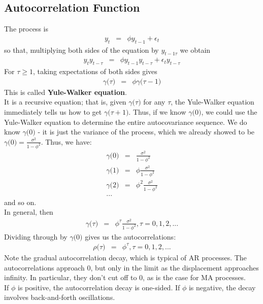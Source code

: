 \subsection{Autocorrelation Function}
The process is
\begin{eqnarray}
y_{t} &=& \phi y_{t - 1} + \epsilon_{t}
\end{eqnarray}
so that, multiplying both sides of the equation by $y_{t - 1\tau}$ we obtain
\begin{eqnarray}
	y_{t}y_{t - \tau} &=& \phi y_{t - 1}y_{t - \tau} + \epsilon_{t} y_{t - \tau}
\end{eqnarray}
For $\tau \geq 1$, taking expectations of both sides gives
\begin{eqnarray}
	\gamma\big(\tau\big) &=& \phi\gamma\big(\tau - 1\big)
\end{eqnarray}
This is called \textbf{\color{blue}Yule-Walker equation}.\\
It is a recursive equation; that is, given $\gamma\big(\tau\big)$ for any $\tau$, the Yule-Walker equation immediately tells us how to get $\gamma\big(\tau + 1\big)$. Thus, if we know $\gamma\big(0\big)$, we could use the Yule-Walker equation to determine the entire autocovariance sequence. We do know $\gamma\big(0\big)$ - it is just the variance of the process, which we already showed to be $\gamma\big(0\big) = \frac{\sigma^{2}}{1 - \phi^{2}}$. Thus, we have:
\begin{eqnarray}
\nonumber
\gamma\big(0\big) &=& \frac{\sigma^{2}}{1 - \phi^{2}}\\
\nonumber
\gamma\big(1\big) &=& \phi\frac{\sigma^{2}}{1 - \phi^{2}}\\
\nonumber
\gamma\big(2\big) &=& \phi^{2}\frac{\sigma^{2}}{1 - \phi^{2}}\\
\nonumber
...
\end{eqnarray}
and so on.\\
In general, then
\begin{eqnarray}
\gamma\big(\tau\big) &=& \phi^{\tau}\frac{\sigma^{2}}{1 - \phi^{2}}, \tau = 0, 1, 2, ...
\end{eqnarray}
Dividing through by $\gamma\big(0\big)$ gives us the autocorrelations:
\begin{eqnarray}
	\rho\big(\tau\big) &=& \phi^{\tau}, \tau = 0, 1, 2, ...
\end{eqnarray}
Note the gradual autocorrelation decay, which is typical of AR processes. The autocorrelations approach 0, but only in the limit as the displacement approaches infinity. In particular, they don't cut off to 0, as is the case for MA processes.\\
If $\phi$ is positive, the autocorrelation decay is one-sided. If $\phi$ is negative, the decay involves back-and-forth oscillations.

